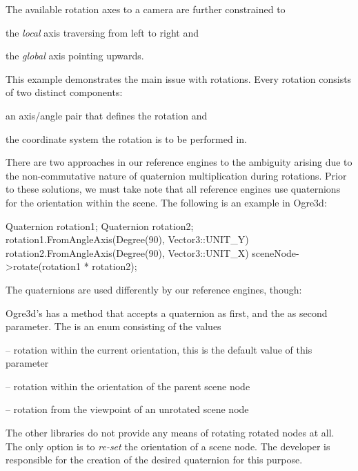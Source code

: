	The available rotation axes to a camera are further constrained to

	\begin{smalllist}
		\item the \emph{local} axis traversing from left to right and
		\item the \emph{global} axis pointing upwards.
	\end{smalllist}

	This example demonstrates the main issue with rotations. Every rotation consists of two distinct components:

	\begin{numlist}
		\item an axis/angle pair that defines the rotation and
		\item the coordinate system the rotation is to be performed in.
	\end{numlist}

	There are two approaches in our reference engines to the ambiguity arising due to the non-commutative nature of quaternion multiplication during rotations. Prior to these solutions, we must take note that all reference engines use quaternions for the orientation within the scene. The following is an example in Ogre3d:

	\begin{code}[2]
		Quaternion rotation1;
		Quaternion rotation2;
		rotation1.FromAngleAxis(Degree(90), Vector3::UNIT_Y)
		rotation2.FromAngleAxis(Degree(90), Vector3::UNIT_X)
		sceneNode->rotate(rotation1 * rotation2);
	\end{code}

	The quaternions are used differently by our reference engines, though:

	\begin{smalllist}
		\item Ogre3d's  has a method  that accepts a quaternion as first, and the  as second parameter. The  is an enum consisting of the values
		\begin{smalllist}
			\item {} -- rotation within the current orientation, this is the default value of this parameter
			\item {} -- rotation within the orientation of the parent scene node
			\item {} -- rotation from the viewpoint of an unrotated scene node
		\end{smalllist}
		\item The other libraries do not provide any means of rotating rotated nodes at all. The only option is to \emph{re-set} the orientation of a scene node. The developer is responsible for the creation of the desired quaternion for this purpose.
	\end{smalllist}

